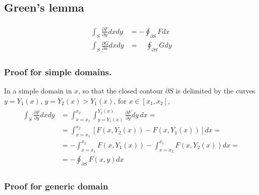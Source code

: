 \documentclass[letterpaper,10pt,english]{jupyterBook}
\begin{document}
\subsection{Green’s lemma}
\label{\detokenize{ch/multivariable/intro:green-s-lemma}}\label{\detokenize{ch/multivariable/intro:multivariable-calculus-green-lemma}}\begin{equation*}
\begin{split}\begin{aligned}
  \int_{S} \frac{\partial F}{\partial y} dx dy & =     - \oint_{\partial S} F dx \\
  \int_{S} \frac{\partial G}{\partial x} dx dy & = \quad \oint_{\partial S} G dy   
\end{aligned}\end{split}
\end{equation*}\subsubsection*{Proof for simple domains.}

\sphinxAtStartPar
In a simple domain in  \(x\), so that the closed contour \(\partial S\) is delimited by the curves \(y=Y_1(x)\), \(y=Y_2(x) > Y_1(x)\), for \(x \in [x_1, x_2]\),
\begin{equation*}
\begin{split}\begin{aligned}
  \int_{S} \frac{\partial F}{\partial y} dx dy 
  & =   \int_{x=x_1}^{x_2} \int_{y = Y_1(x)}^{Y_2(x)} \frac{\partial F}{\partial y} dy \, dx = \\
  & =   \int_{x=x_1}^{x_2} \left[ F(x,Y_2(x)) - F(x,Y_1(x)) \right] dx = \\
  & = - \int_{x=x_1}^{x_2} F(x,Y_1(x)) - \int_{x=x_2}^{x_1} F(x, Y_2(x)) dx = \\
  & = - \oint_{\partial S} F(x,y) dx 
\end{aligned}\end{split}
\end{equation*}\subsubsection*{Proof for generic domain}

\sphinxAtStartPar
{}
\end{document}
